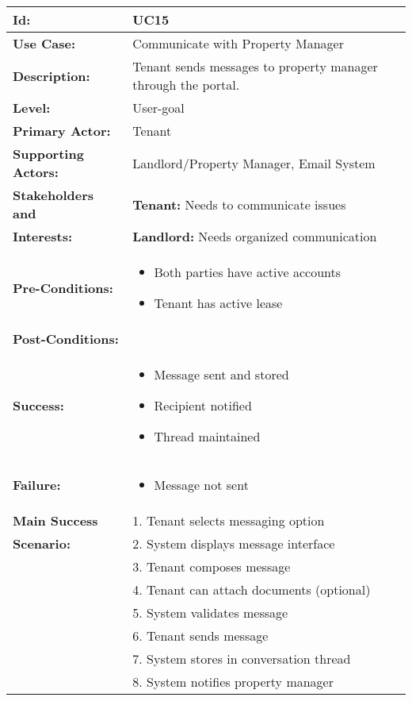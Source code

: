 \documentclass[12pt]{article}
\begin{document}
\begin{longtable}{|p{3cm}|p{11cm}|}
\hline
\textbf{Id:} & UC15 \\
\hline
\textbf{Use Case:} & Communicate with Property Manager \\
\hline
\textbf{Description:} & Tenant sends messages to property manager through the portal. \\
\hline
\textbf{Level:} & User-goal \\
\hline
\textbf{Primary Actor:} & Tenant \\
\hline
\textbf{Supporting Actors:} & Landlord/Property Manager, Email System \\
\hline
\textbf{Stakeholders and} & \textbf{Tenant:} Needs to communicate issues \\
\textbf{Interests:} & \textbf{Landlord:} Needs organized communication \\
\hline
\textbf{Pre-Conditions:} & 
\begin{itemize}
    \item Both parties have active accounts
    \item Tenant has active lease
\end{itemize} \\
\hline
\textbf{Post-Conditions:} & \\
\textbf{Success:} & 
\begin{itemize}
    \item Message sent and stored
    \item Recipient notified
    \item Thread maintained
\end{itemize} \\
\textbf{Failure:} & 
\begin{itemize}
    \item Message not sent
\end{itemize} \\
\hline
\textbf{Main Success} & 1. Tenant selects messaging option \\
\textbf{Scenario:} & 2. System displays message interface \\
& 3. Tenant composes message \\
& 4. Tenant can attach documents (optional) \\
& 5. System validates message \\
& 6. Tenant sends message \\
& 7. System stores in conversation thread \\
& 8. System notifies property manager \\

\end{longtable}
\end{document}
